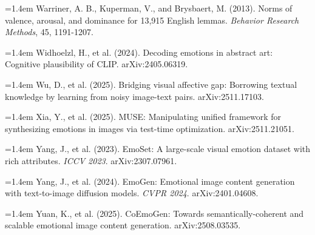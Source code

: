 \documentclass[10pt]{article}
\newcommand{\refentry}[1]{\par\noindent\hangindent=1.4em\hangafter=1 {\small #1}\par}
\begin{document}
\refentry{Warriner, A. B., Kuperman, V., and Brysbaert, M. (2013). Norms of valence, arousal, and dominance for 13,915 English lemmas. \emph{Behavior Research Methods}, 45, 1191-1207.}
\refentry{Widhoelzl, H., et al. (2024). Decoding emotions in abstract art: Cognitive plausibility of CLIP. arXiv:2405.06319.}
\refentry{Wu, D., et al. (2025). Bridging visual affective gap: Borrowing textual knowledge by learning from noisy image-text pairs. arXiv:2511.17103.}
\refentry{Xia, Y., et al. (2025). MUSE: Manipulating unified framework for synthesizing emotions in images via test-time optimization. arXiv:2511.21051.}
\refentry{Yang, J., et al. (2023). EmoSet: A large-scale visual emotion dataset with rich attributes. \emph{ICCV 2023}. arXiv:2307.07961.}
\refentry{Yang, J., et al. (2024). EmoGen: Emotional image content generation with text-to-image diffusion models. \emph{CVPR 2024}. arXiv:2401.04608.}
\refentry{Yuan, K., et al. (2025). CoEmoGen: Towards semantically-coherent and scalable emotional image content generation. arXiv:2508.03535.}
\end{document}
